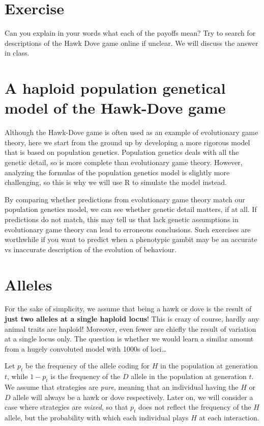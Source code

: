\documentclass[
]{book}
\begin{document}
\hypertarget{exercise-1}{%
\section{Exercise}\label{exercise-1}}

Can you explain in your words what each of the payoffs mean? Try to search for descriptions of the Hawk Dove game online if unclear. We will discuss the answer in class.

\hypertarget{a-haploid-population-genetical-model-of-the-hawk-dove-game}{%
\section{A haploid population genetical model of the Hawk-Dove game}\label{a-haploid-population-genetical-model-of-the-hawk-dove-game}}

Although the Hawk-Dove game is often used as an example of evolutionary game theory, here we start from the ground up by developing a more rigorous model that is based on population genetics. Population genetics deals with all the genetic detail, so is more complete than evolutionary game theory. However, analyzing the formulas of the population genetics model is slightly more challenging, so this is why we will use R to simulate the model instead.

By comparing whether predictions from evolutionary game theory match our population genetics model, we can see whether genetic detail matters, if at all. If predictions do not match, this may tell us that lack genetic assumptions in evolutionary game theory can lead to erroneous conclusions. Such exercises are worthwhile if you want to predict when a phenotypic gambit may be an accurate vs inaccurate description of the evolution of behaviour.

\hypertarget{alleles}{%
\section{Alleles}\label{alleles}}

For the sake of simplicity, we assume that being a hawk or dove is the result
of \textbf{just two alleles at a single haploid locus}!
This is crazy of course, hardly any animal traits are haploid! Moreover, even
fewer are chiefly the result of variation at a single locus only. The question is whether we would learn a similar amount from a hugely convoluted model with 1000s of loci\ldots{}

Let \(p_{t}\) be the frequency of the allele coding for \(H\) in the population at generation \(t\), while \(1-p_{t}\) is the frequency of the \(D\) allele in the population at generation \(t\). We assume that strategies are \emph{pure}, meaning that an individual having the \(H\) or \(D\) allele will always be a hawk or dove respectively. Later on, we will consider a case where strategies are \emph{mixed}, so that \(p_{t}\) does not reflect the frequency of the \(H\) allele, but the probability with which each individual plays \(H\) at each interaction.
\end{document}
